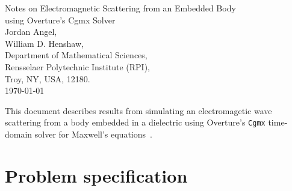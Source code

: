\documentclass[11pt]{article}
\begin{document}



\newcommand{\bogus}[1]{}  %

\vspace{5\baselineskip}
\begin{flushleft}
{\LARGE
Notes on Electromagnetic Scattering from an Embedded Body \\
using Overture's Cgmx Solver\\
}
\vspace{2\baselineskip}
Jordan Angel,  \\
William D. Henshaw, \\
% 
\vspace{2\baselineskip}
% 
Department of Mathematical Sciences, \\
Rensselaer Polytechnic Institute (RPI), \\
Troy, NY, USA, 12180. \\
\vspace{\baselineskip}
\today\\

\vspace{4\baselineskip}


This document describes results from simulating an electromagetic wave scattering from a
body embedded in a dielectric using Overture's {\tt Cgmx} time-domain solver for
Maxwell's equations~\cite{CgmxUserGuide}. 

\end{flushleft}

\tableofcontents

\clearpage


\section{Problem specification}


\clearpage
\end{document}
